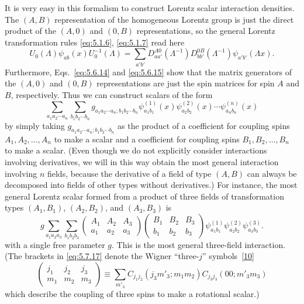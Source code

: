 It is very easy in this formalism to construct Lorentz scalar interaction
densities. The $(A,B)$ representation of the homogeneous Lorentz group is just
the direct product of the $(A,0)$ and $(0,B)$ representations, so the general
Lorentz transformation rules \eqref{eq:5.1.6}, \eqref{eq:5.1.7} read here
\begin{equation}
U_0(\Lambda)\psi_{ab}(x)U_0^{-1}(\Lambda)=
\sum_{a'b'}D^{A0}_{aa'}(\Lambda^{-1})D^{0B}_{bb'}(\Lambda^{-1})
\psi_{a'b'}(\Lambda x).
\tag{5.7.16}\label{eq:5.7.16}
\end{equation}
Furthermore, Eqs.~\eqref{eq:5.6.14} and \eqref{eq:5.6.15} show that the matrix generators of the
$(A,0)$ and $(0,B)$ representations are just the spin matrices for spin $A$
and $B$, respectively. Thus we can construct scalars of the form
\begin{equation}
\sum_{a_1a_2\cdots a_n}\sum_{b_1b_2\cdots b_n}
g_{a_1a_2\cdots a_n;b_1b_2\cdots b_n}
\psi^{(1)}_{a_1b_1}(x)\psi^{(2)}_{a_2b_2}(x)\cdots\psi^{(n)}_{a_nb_n}(x)
\tag{5.7.17}\label{eq:5.7.17}
\end{equation}
by simply taking $g_{a_1a_2\cdots a_n;b_1b_2\cdots b_n}$ as the product of a
coefficient for coupling spins $A_1,A_2,\ldots,A_n$ to make a scalar and a
coefficient for coupling spins $B_1,B_2,\ldots,B_n$ to make a scalar. (Even
though we do not explicitly consider interactions involving derivatives, we
will in this way obtain the most general interaction involving $n$ fields,
because the derivative of a field of type $(A,B)$ can always be decomposed into
fields of other types without derivatives.) For instance, the most general
Lorentz scalar formed from a product of three fields of transformation types
$(A_1,B_1)$, $(A_2,B_2)$, and $(A_3,B_3)$ is
\begin{equation}
g\sum_{a_1a_2a_3}\sum_{b_1b_2b_3}
\begin{pmatrix}A_1&A_2&A_3\\a_1&a_2&a_3\end{pmatrix}
\begin{pmatrix}B_1&B_2&B_3\\b_1&b_2&b_3\end{pmatrix}
\psi^{(1)}_{a_1b_1}\psi^{(2)}_{a_2b_2}\psi^{(3)}_{a_3b_3}.
\tag{5.7.18}\label{eq:5.7.18}
\end{equation}
with a single free parameter $g$. This is the most general three-field
interaction. (The brackets in \eqref{eq:5.7.17} denote the Wigner ``three-$j$''
symbols~\hyperref[ref:5.10]{[10]}
\[
\begin{pmatrix}j_1&j_2&j_3\\m_1&m_2&m_3\end{pmatrix}
\equiv\sum_{m'_3}C_{j_1j_2}(j_3m'_3;m_1m_2)C_{j_3j_3}(00;m'_3m_3)
\]
which describe the coupling of three spins to make a rotational scalar.)

